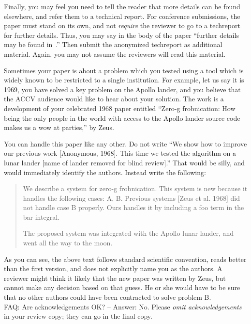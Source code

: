 \documentclass[runningheads]{llncs}
\begin{document}
Finally, you may feel you need to tell the reader that more details can be found elsewhere, and refer them to a technical report.  For conference submissions, the paper must stand on its own, and not {\em require} the reviewer to go to a techreport for further details.  Thus, you may say in the body of the paper ``further details may be found in~\cite{Authors16b}.''  Then submit the anonymized techreport as additional material. Again, you may not assume the reviewers will read this material.

Sometimes your paper is about a problem which you tested using a tool which
is widely known to be restricted to a single institution.  For example,
let us say it is 1969, you have solved a key problem on the Apollo lander,
and you believe that the ACCV audience would like to hear about your
solution.  The work is a development of your celebrated 1968 paper entitled
``Zero-g frobnication: How being the only people in the world with access to
the Apollo lander source code makes us a wow at parties,'' by Zeus.

You can handle this paper like any other.  Do not write ``We show how to
improve our previous work [Anonymous, 1968].  This time we tested the
algorithm on a lunar lander [name of lander removed for blind review].''
That would be silly, and would immediately identify the authors. Instead
write the following:
%
\begin{quotation}
\noindent
   We describe a system for zero-g frobnication.  This
   system is new because it handles the following cases:
   A, B.  Previous systems [Zeus et al. 1968] did not
   handle case B properly.  Ours handles it by including
   a foo term in the bar integral.

   The proposed system was integrated with the Apollo
   lunar lander, and went all the way to the moon.  
\end{quotation}
%
As you can see, the above text follows standard scientific convention,
reads better than the first version, and does not explicitly name you as
the authors.  A reviewer might think it likely that the new paper was
written by Zeus, but cannot make any decision based on that guess.
He or she would have to be sure that no other authors could have been
contracted to solve problem B. \\

\noindent FAQ: Are acknowledgements OK?  -- Answer: No. Please {\it omit
acknowledgements} in your review copy; they can go in the final copy.

\end{document}
